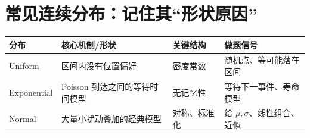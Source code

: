 \documentclass[11pt,a4paper,openany]{ctexbook}
\begin{document}
\section{常见连续分布：记住其“形状原因”}
\begin{longtable}{L{2.4cm}L{3.8cm}L{3.8cm}L{\dimexpr\linewidth-10.52cm\relax}}
\toprule
\textbf{分布} & \textbf{核心机制/形状} & \textbf{关键结构} & \textbf{做题信号}\\
\midrule
Uniform & 区间内没有位置偏好 & 密度常数 & 随机点、等可能落在区间\\
Exponential & Poisson 到达之间的等待时间模型 & 无记忆性 & 等待下一事件、寿命模型\\
Normal & 大量小扰动叠加的经典模型 & 对称、标准化 & 给 $\mu,\sigma$、线性组合、近似\\
\bottomrule
\end{longtable}
\end{document}
